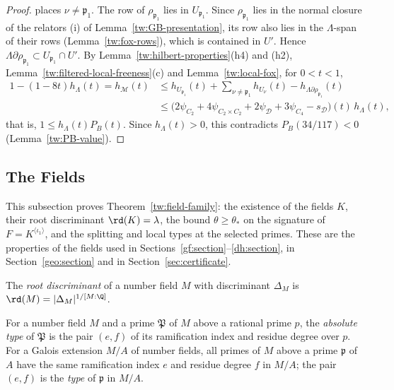 \begin{proof}
places $\nu\ne\mathfrak p_1$. The row of $\rho_{\mathfrak p_1}$ lies in
$U_{\mathfrak p_1}$. Since $\rho_{\mathfrak p_1}$ lies in the normal closure of
the relators (i) of Lemma~\ref{tw:GB-presentation}, its row also lies in the
$\Lambda$-span of their rows (Lemma~\ref{tw:fox-rows}), which is contained in
$U'$. Hence $\Lambda\partial\rho_{\mathfrak p_1}\subset U_{\mathfrak p_1}\cap U'$.
By Lemma~\ref{tw:hilbert-properties}(h4) and (h2),
Lemma~\ref{tw:filtered-local-freeness}(c) and Lemma~\ref{tw:local-fox}, for
$0<t<1$,
\begin{align*}
 1-(1-8t)h_\Lambda(t)=h_{\mathcal M}(t)
 &\le h_{U_{\mathfrak p_1}}(t)+\sum_{\nu\ne\mathfrak p_1}h_{U_\nu}(t)
 -h_{\Lambda\partial\rho_{\mathfrak p_1}}(t)\\
 &\le\bigl(2\psi_{C_2}+4\psi_{C_2\times C_2}+2\psi_{\mathcal D}+3\psi_{C_4}-s_{\mathcal D}\bigr)(t)
 \,h_\Lambda(t),
\end{align*}
that is, $1\le h_\Lambda(t)P_B(t)$. Since $h_\Lambda(t)>0$, this contradicts
$P_B(34/117)<0$ (Lemma~\ref{tw:PB-value}).
\end{proof}

\subsection{The Fields}\label{tw:fields-section}
This subsection proves Theorem~\ref{tw:field-family}: the existence of the
fields $K$, their root discriminant $\rd(K)=\lambda$, the bound
$\theta\ge\theta_*$ on the signature of $F=K^{\langle\iota_1\rangle}$, and
the splitting and local types at the selected primes. These are the
properties of the fields used in
Sections~\ref{gf:section}--\ref{dh:section}, in Section~\ref{geo:section} and
in Section~\ref{sec:certificate}.

\begin{definition}\label{tw:rd}
The \emph{root discriminant} of a number field $M$ with discriminant
$\Delta_M$ is $\rd(M)=|\Delta_M|^{1/[M:\Q]}$.
\end{definition}

\begin{definition}\label{tw:type}
For a number field $M$ and a prime $\mathfrak P$ of $M$ above a rational
prime $p$, the \emph{absolute type} of $\mathfrak P$ is the pair $(e,f)$ of
its ramification index and residue degree over $p$. For a Galois extension
$M/A$ of number fields, all primes of $M$ above a prime $\mathfrak p$ of $A$
have the same ramification index $e$ and residue degree $f$ in $M/A$; the
pair $(e,f)$ is the \emph{type} of $\mathfrak p$ in $M/A$.
\end{definition}

